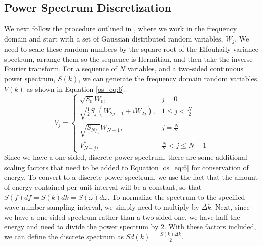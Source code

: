 \subsection{Power Spectrum Discretization}
We next follow the procedure outlined in \cite{percival_spectra},  where we work in the frequency domain and start with a set of Gaussian distributed random variables, $W_j$. We need to scale these random numbers by the square root of the Elfouhaily variance spectrum, arrange them so the sequence is Hermitian, and then take the inverse Fourier transform. For a sequence of $N$ variables, and a two-sided continuous power spectrum, $S(k)$, we can generate the frequency domain random variables, $V(k)$ as shown in Equation \ref{os_eq:6}.
\begin{equation}
  \label{os_eq:6}   
  V_j = \begin{cases}
    \sqrt{S_0}W_0, & j = 0 \\
    \sqrt{\frac{1}{2}S_j}\left(W_{2j-1} + iW_{2j} \right), & 1 \leq j <\frac{N}{2} \\
    \sqrt{S_{N/_2}}W_{N-1}, & j = \frac{N}{2} \\
    V_{N-j}^*, &  \frac{N}{2} < j \leq N-1 
  \end{cases} 
\end{equation}
Since we have a one-sided, discrete power spectrum, there are some additional scaling factors that need to be added to Equation \ref{os_eq:6} for conservation of energy. To convert to a discrete power spectrum, we use the fact that the amount of energy contained per unit interval will be a constant, so that $S(f)df = S(k)dk = S(\omega) d\omega$. To normalize the spectrum to the specified wave number sampling interval, we simply need to multiply by $\Delta k$. Next, since we have a one-sided spectrum rather than a two-sided one, we have half the energy and need to divide the power spectrum by 2. With these factors included, we can define the discrete spectrum as $Sd(k) = \frac{S(k)\Delta k}{2}$.

